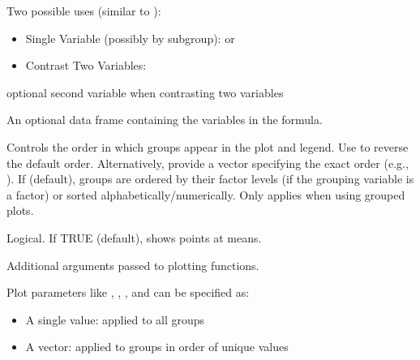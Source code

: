 \documentclass[a4paper]{book}
\begin{document}
%
\begin{Arguments}
\begin{ldescription}
\item[\code{formula}] Two possible uses (similar to ):
\begin{itemize}

\item{} Single Variable (possibly by subgroup):  or 
\item{} Contrast Two Variables: 

\end{itemize}


\item[\code{y2}] optional second variable when contrasting two variables 

\item[\code{data}] An optional data frame containing the variables in the formula.

\item[\code{order}] Controls the order in which groups appear in the plot and legend. 
Use  to reverse the default order. Alternatively, provide a vector specifying
the exact order (e.g., ). If  (default), groups are 
ordered by their factor levels (if the grouping variable is a factor) or sorted 
alphabetically/numerically. Only applies when using grouped plots.

\item[\code{show\_means}] Logical. If TRUE (default), shows points at means.

\item[\code{...}] Additional arguments passed to plotting functions.
\end{ldescription}
\end{Arguments}
%
\begin{Details}
Plot parameters like
, , , and  can be specified as:
\begin{itemize}

\item{} A single value: applied to all groups
\item{} A vector: applied to groups in order of unique  values

\end{itemize}

\end{Details}
%
\end{document}
